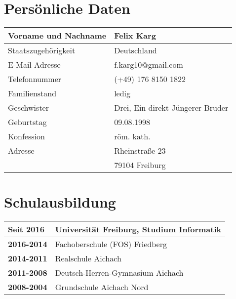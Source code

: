 \documentclass{scrartcl}
\begin{document}
\section*{Persönliche Daten}

\begin{tabular}{|l|l|}
    \hline
    Vorname und Nachname & Felix Karg \\ \hline
    Staatszugehörigkeit & Deutschland \\ \hline
    E-Mail Adresse & f.karg10@gmail.com \\ \hline
    Telefonnummer & (+49) 176 8150 1822 \\ \hline
    Familienstand & ledig \\ \hline
    Geschwister & Drei, Ein direkt Jüngerer Bruder \\ \hline
    Geburtstag & 09.08.1998 \\ \hline
    Konfession & röm. kath. \\ \hline
    Adresse & Rheinstraße 23 \\
            & 79104 Freiburg \\ \hline
\end{tabular}

\section*{Schulausbildung}
\begin{tabular}{|l|l|}
    \hline
    \textbf{Seit 2016} & Universität Freiburg, Studium Informatik \\ \hline
    \textbf{2016-2014} & Fachoberschule (FOS) Friedberg \\ \hline
    \textbf{2014-2011} & Realschule Aichach \\ \hline
    \textbf{2011-2008} & Deutsch-Herren-Gymnasium Aichach \\ \hline
    \textbf{2008-2004} & Grundschule Aichach Nord \\ \hline
\end{tabular}
\end{document}
